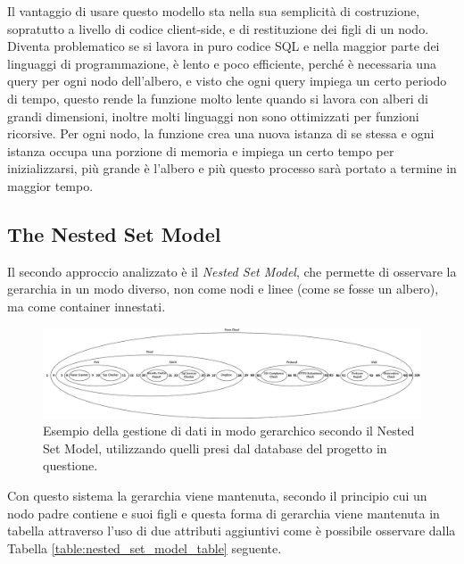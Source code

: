 \hfill\break
Il vantaggio di usare questo modello sta nella sua semplicità di costruzione, sopratutto a livello di codice client-side, 
e di restituzione dei figli di un nodo. Diventa problematico se si lavora in puro codice SQL e nella maggior parte dei linguaggi 
di programmazione, è lento e poco efficiente, perché è necessaria una query per ogni nodo dell'albero, e visto che ogni query impiega 
un certo periodo di tempo, questo rende la funzione molto lente quando si lavora con alberi di grandi dimensioni, inoltre molti linguaggi 
non sono ottimizzati per funzioni ricorsive. Per ogni nodo, la funzione crea una nuova istanza di se stessa e ogni istanza occupa 
una porzione di memoria e impiega un certo tempo per inizializzarsi, più grande è l'albero e più questo processo sarà portato a termine 
in maggior tempo.
%
\subsection{The Nested Set Model}
Il secondo approccio analizzato è il \textit{Nested Set Model}, che permette di osservare la gerarchia in un modo diverso, non 
come nodi e linee (come se fosse un albero), ma come container innestati.
%
\begin{figure}[ht!]
    \includegraphics[scale=0.30]{images/MC_Rec_NSM_Container.png}
    \caption{Esempio della gestione di dati in modo gerarchico secondo il Nested Set Model, utilizzando quelli presi dal database del 
    progetto in questione.}
    \label{fig:MC_Rec_NSM_Container}
\end{figure}
%
Con questo sistema la gerarchia viene mantenuta, secondo il principio cui un nodo padre contiene e suoi figli e questa forma di 
gerarchia viene mantenuta in tabella attraverso l'uso di due attributi aggiuntivi come è possibile osservare dalla Tabella 
\ref{table:nested_set_model_table} seguente.
